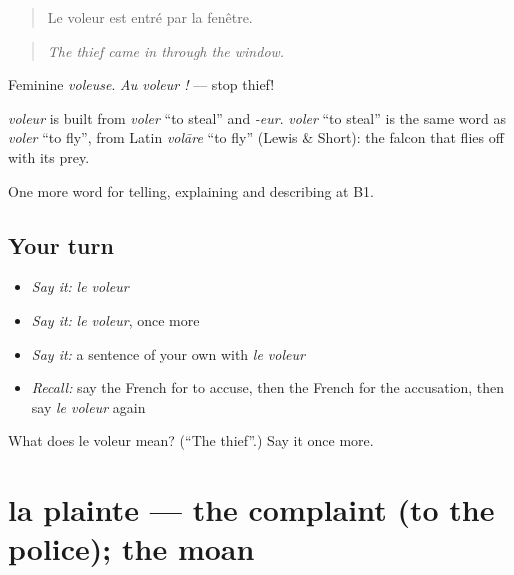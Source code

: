 \begin{quote}
Le voleur est entré par la fenêtre.
\end{quote}

\begin{quote}
\emph{The thief came in through the window.}
\end{quote}

Feminine \emph{voleuse}. \emph{Au voleur !} — stop thief!

\begin{cousinweb}
\emph{voleur} is built from \emph{voler} \textquotedblleft{}to steal\textquotedblright{} and \emph{-eur}. \emph{voler} \textquotedblleft{}to steal\textquotedblright{} is the same word as \emph{voler} \textquotedblleft{}to fly\textquotedblright{}, from Latin \emph{volāre} \textquotedblleft{}to fly\textquotedblright{} (Lewis \& Short): the falcon that flies off with its prey.
\end{cousinweb}

\begin{grammarlens}[title={What you've built}]
One more word for telling, explaining and describing at B1.
\end{grammarlens}

\subsection*{Your turn}
\begin{itemize}
\raggedright
  \item \emph{Say it:} \emph{le voleur}
  \item \emph{Say it:} \emph{le voleur}, once more
  \item \emph{Say it:} a sentence of your own with \emph{le voleur}
  \item \emph{Recall:} say the French for to accuse, then the French for the accusation, then say \emph{le voleur} again
\end{itemize}

\begin{tcolorbox}[breakable,colback=teal!4,colframe=teal!35!black,title={Before you move on}]
What does le voleur mean? (\textquotedblleft{}The thief\textquotedblright{}.) Say it once more.
\end{tcolorbox}
\section[la plainte]{la plainte — the complaint (to the police); the moan}

